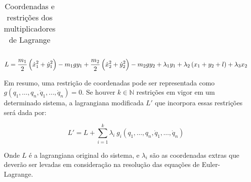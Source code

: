\begin{eg}
\begin{table}[H]
\begin{tabularx}{\textwidth}{lllX}
            \bottomrule

        \end{tabularx}

    \caption{Coordenadas e restrições dos multiplicadores de Lagrange}
    \label{tab:lagrange_multipliers}

\end{table}

    \begin{equation}
        \label{eq:eg_lag_mult}
        L = \frac{m_1}{2} \del{{\dot x_1}^2 + {\dot y_1}^2} - m_1gy_1 + %
            \frac{m_2}{2} \del{{\dot x_2}^2 + {\dot y_2}^2} - m_2gy_2 + %
            \lambda_1 y_1 + %
            \lambda_2 \del{x_1 + y_2 + l} + %
            \lambda_3 x_2
    \end{equation}
\end{eg}

Em resumo, uma restrição de coordenadas pode ser representada como $g(q_1,
\ldots, q_n, \dot q_1, \ldots, \dot q_n) = 0$. Se houver $k \in \mathbb{N}$
restrições em vigor em um determinado sistema, a lagrangiana modificada $L'$ que
incorpora essas restrições será dada por:

\begin{equation}
    \label{eq:lag_mult}
    L' = L + \sum_{i=1}^{k} \lambda_i~g_i(q_1, \ldots, q_n, \dot q_1, \ldots, %
        \dot q_n)
\end{equation}

Onde $L$ é a lagrangiana original do sistema, e $\lambda_i$ são as coordenadas
extras que deverão ser levadas em consideração na resolução das equações de
Euler-Lagrange.
